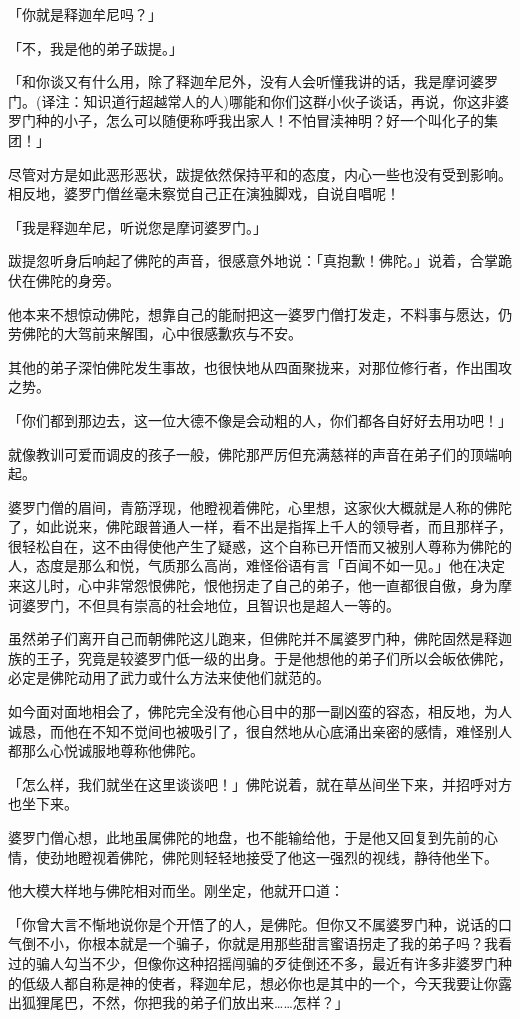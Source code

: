\documentclass[12pt,twoside,openany]{book}
\begin{document}
「你就是释迦牟尼吗？」

「不，我是他的弟子跋提。」

「和你谈又有什么用，除了释迦牟尼外，没有人会听懂我讲的话，我是摩诃婆罗门。(译注：知识道行超越常人的人)哪能和你们这群小伙子谈话，再说，你这非婆罗门种的小子，怎么可以随便称呼我出家人！不怕冒渎神明？好一个叫化子的集团！」

尽管对方是如此恶形恶状，跋提依然保持平和的态度，内心一些也没有受到影响。相反地，婆罗门僧丝毫未察觉自己正在演独脚戏，自说自唱呢！

「我是释迦牟尼，听说您是摩诃婆罗门。」

跋提忽听身后响起了佛陀的声音，很感意外地说：「真抱歉！佛陀。」说着，合掌跪伏在佛陀的身旁。

他本来不想惊动佛陀，想靠自己的能耐把这一婆罗门僧打发走，不料事与愿达，仍劳佛陀的大驾前来解围，心中很感歉疚与不安。

其他的弟子深怕佛陀发生事故，也很快地从四面聚拢来，对那位修行者，作出围攻之势。

「你们都到那边去，这一位大德不像是会动粗的人，你们都各自好好去用功吧！」

就像教训可爱而调皮的孩子一般，佛陀那严厉但充满慈祥的声音在弟子们的顶端响起。

婆罗门僧的眉间，青筋浮现，他瞪视着佛陀，心里想，这家伙大概就是人称的佛陀了，如此说来，佛陀跟普通人一样，看不出是指挥上千人的领导者，而且那样子，很轻松自在，这不由得使他产生了疑惑，这个自称已开悟而又被别人尊称为佛陀的人，态度是那么和悦，气质那么高尚，难怪俗语有言「百闻不如一见。」他在决定来这儿时，心中非常怨恨佛陀，恨他拐走了自己的弟子，他一直都很自傲，身为摩诃婆罗门，不但具有崇高的社会地位，且智识也是超人一等的。

虽然弟子们离开自己而朝佛陀这儿跑来，但佛陀并不属婆罗门种，佛陀固然是释迦族的王子，究竟是较婆罗门低一级的出身。于是他想他的弟子们所以会皈依佛陀，必定是佛陀动用了武力或什么方法来使他们就范的。

如今面对面地相会了，佛陀完全没有他心目中的那一副凶蛮的容态，相反地，为人诚恳，而他在不知不觉间也被吸引了，很自然地从心底涌出亲密的感情，难怪别人都那么心悦诚服地尊称他佛陀。

「怎么样，我们就坐在这里谈谈吧！」佛陀说着，就在草丛间坐下来，并招呼对方也坐下来。

婆罗门僧心想，此地虽属佛陀的地盘，也不能输给他，于是他又回复到先前的心情，使劲地瞪视着佛陀，佛陀则轻轻地接受了他这一强烈的视线，静待他坐下。

他大模大样地与佛陀相对而坐。刚坐定，他就开口道：

「你曾大言不惭地说你是个开悟了的人，是佛陀。但你又不属婆罗门种，说话的口气倒不小，你根本就是一个骗子，你就是用那些甜言蜜语拐走了我的弟子吗？我看过的骗人勾当不少，但像你这种招摇闯骗的歹徒倒还不多，最近有许多非婆罗门种的低级人都自称是神的使者，释迦牟尼，想必你也是其中的一个，今天我要让你露出狐狸尾巴，不然，你把我的弟子们放出来……怎样？」
\end{document}

